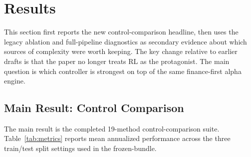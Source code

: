 \documentclass[11pt]{article}
\begin{document}
\section{Results}

This section first reports the new control-comparison headline, then uses the
legacy ablation and full-pipeline diagnostics as secondary evidence about which
sources of complexity were worth keeping. The key change relative to earlier
drafts is that the paper no longer treats RL as the protagonist. The main
question is which controller is strongest on top of the same finance-first
alpha engine.

\subsection{Main Result: Control Comparison}

The main result is the completed 19-method control-comparison suite. Table~\ref{tab:metrics}
reports mean annualized performance across the three train/test split settings
used in the frozen-bundle.
\end{document}
